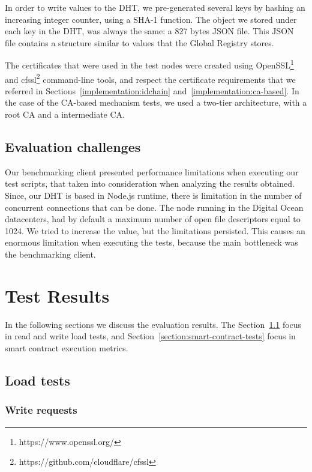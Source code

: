 In order to write values to the DHT, we pre-generated several keys by hashing an increasing integer counter, using a SHA-1 function.
The object we stored under each key in the DHT, was always the same: a 827 bytes JSON file.
This JSON file contains a structure similar to values that the Global Registry stores.

The certificates that were used in the test nodes were created using OpenSSL\footnote{https://www.openssl.org/} and cfssl\footnote{https://github.com/cloudflare/cfssl} command-line tools, and respect the certificate requirements that we referred in Sections~\ref{implementation:idchain} and~\ref{implementation:ca-based}.
In the case of the CA-based mechanism tests, we used a two-tier architecture, with a root CA and a intermediate CA.

\subsection{Evaluation challenges}

Our benchmarking client presented performance limitations when executing our test scripts, that taken into consideration when analyzing the results obtained.
Since, our DHT is based in Node.js runtime, there is limitation in the number of concurrent connections that can be done.
The node running in the Digital Ocean datacenters, had by default a maximum number of open file descriptors equal to 1024.
We tried to increase the value, but the limitations persisted.
This causes an enormous limitation when executing the tests, because the main bottleneck was the benchmarking client.

\section{Test Results}
\label{section:results}
In the following sections we discuss the evaluation results.
The Section~\ref{section:load-tests} focus in read and write load tests, and Section~\ref{section:smart-contract-tests} focus in smart contract execution metrics.

\subsection{Load tests}
\label{section:load-tests}

\subsubsection{Write requests}

